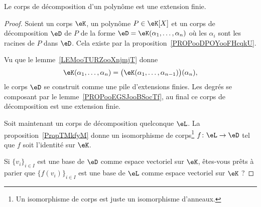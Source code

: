 \begin{corollary}    \label{CORooELAUooPQGLkR}
    Le corps de décomposition d'un polynôme est une extension finie.
\end{corollary}

\begin{proof}
    Soient un corps \( \eK\), un polynôme \( P\in \eK[X]\) et un corps de décomposition \( \eD\) de \( P\) de la forme \( \eD=\eK(\alpha_1,\ldots, \alpha_n)\) où les \( \alpha_i\) sont les racines de \( P\) dans \( \eD\). Cela existe par la proposition~\ref{PROPooDPOYooFHcqkU}.

    Vu que le lemme~\ref{LEMooTURZooXnjmjT} donne
    \begin{equation}
        \eK(\alpha_1,\ldots, \alpha_n)=\big( \eK(\alpha_1,\ldots, \alpha_{n-1}) \big)(\alpha_n),
    \end{equation}
    le corps \( \eD\) se construit comme une pile d'extensions finies. Les degrés se composant par le lemme~\ref{PROPooEGSJooBSocTf}, au final ce corps de décomposition est une extension finie.

    Soit maintenant un corps de décomposition quelconque \( \eL\). La proposition~\ref{PropTMkfyM} donne un isomorphisme de corps\footnote{Un isomorphisme de corps est juste un isomorphisme d'anneaux.} \( f\colon \eL\to \eD\) tel que \( f\) soit l'identité sur \( \eK\).

    Si \( \{ v_i \}_{i\in I}\) est une base de \( \eD\) comme espace vectoriel sur \( \eK\), êtes-vous prêts à parier que \( \{ f(v_i) \}_{i\in I}\) est une base de \( \eL\) comme espace vectoriel sur \( \eK\) ?
\end{proof}

